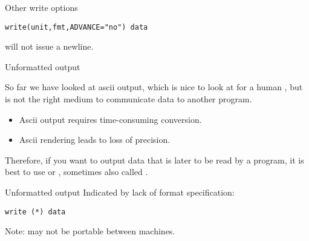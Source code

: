  {Other write options}

\begin{lstlisting}
write(unit,fmt,ADVANCE="no") data
\end{lstlisting}
will not issue a newline.

 

 {Unformatted output}
\label{sec:rawdataf}

So far we have looked at ascii output, which is nice to look at for a
human , but is not the right medium to communicate data to another
program.
\begin{itemize}
\item Ascii output requires time-consuming conversion.
\item Ascii rendering leads to loss of precision.
\end{itemize}
Therefore, if you want to output data that is later to be read by a
program, it is best to use  or
, sometimes also called
.

\begin{block}{Unformatted output}
  Indicated by lack of format specification:
\begin{lstlisting}
write (*) data
\end{lstlisting}
  Note: may not be portable between machines.
\end{block}
